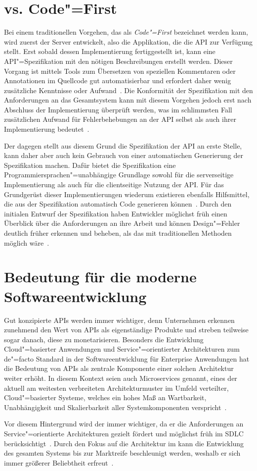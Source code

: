 \section{\AF vs. Code"=First}
Bei einem traditionellen Vorgehen, das als \emph{Code"=First} bezeichnet werden kann, wird zuerst der Server entwickelt, also die Applikation, die die \ac{API} zur Verfügung stellt.
Erst sobald dessen Implementierung fertiggestellt ist, kann eine \ac{API}"=Spezifikation mit den nötigen Beschreibungen erstellt werden.
Dieser Vorgang ist mittels Tools zum Übersetzen von speziellen Kommentaren oder Annotationen im Quellcode gut automatisierbar und erfordert daher wenig zusätzliche Kenntnisse oder Aufwand~\cite{ope24}.
Die Konformität der Spezifikation mit den Anforderungen an das Gesamtsystem kann mit diesem Vorgehen jedoch erst nach Abschluss der Implementierung überprüft werden, was im schlimmsten Fall zusätzlichen Aufwand für Fehlerbehebungen an der \ac{API} selbst als auch ihrer Implementierung bedeutet~\cite{vol22}.

Der \AFA dagegen stellt \ua aus diesem Grund die Spezifikation der \ac{API} an erste Stelle, kann daher aber auch kein Gebrauch von einer automatischen Generierung der Spezifikation machen.
Dafür bietet die Spezifikation eine Programmiersprachen"=unabhängige Grundlage sowohl für die serverseitige Implementierung als auch für die clientseitige Nutzung der \ac{API}.
Für das Grundgerüst dieser Implementierungen wiederum existieren ebenfalls Hilfsmittel, die aus der Spezifikation automatisch Code generieren können~\cite{ope24}.
Durch den initialen Entwurf der Spezifikation haben Entwickler möglichst früh einen Überblick über die Anforderungen an ihre Arbeit und können Design"=Fehler deutlich früher erkennen und beheben, als das mit traditionellen Methoden möglich wäre~\cite[1627]{cha21}.

\section{Bedeutung für die moderne Softwareentwicklung}
Gut konzipierte \acp{API} werden immer wichtiger, denn Unternehmen erkennen zunehmend den Wert von \acp{API} als eigenständige Produkte und streben teilweise sogar danach, diese zu monetarisieren.
Besonders die Entwicklung Cloud"=basierter Anwendungen und Service"=orientierter Architekturen zum de"=facto Standard in der Softwareentwicklung für Enterprise Anwendungen hat die Bedeutung von \acp{API} als zentrale Komponente einer solchen Architektur weiter erhöht.
In diesem Kontext seien auch Microservices genannt, eines der aktuell am weitesten verbreiteten Architekturmuster im Umfeld verteilter, Cloud"=basierter Systeme, welches ein hohes Maß an Wartbarkeit, Unabhängigkeit und Skalierbarkeit aller Systemkomponenten verspricht~\cites[73-75]{bea22}[5]{kul23}.

Vor diesem Hintergrund wird der \AFA immer wichtiger, da er die Anforderungen an Service"=orientierte Architekturen gezielt fördert und möglichst früh im \ac{SDLC} berücksichtigt~\cite[1627]{cha21}.
Durch den Fokus auf die Architektur im \AFA kann die Entwicklung des gesamten Systems bis zur Marktreife beschleunigt werden, weshalb er sich immer größerer Beliebtheit erfreut~\cite[76]{bea22}.